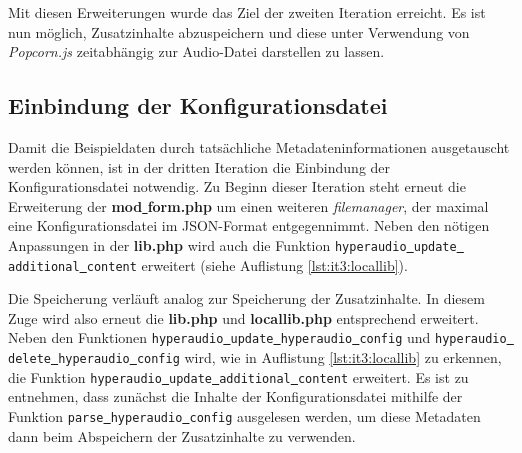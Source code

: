 Mit diesen Erweiterungen wurde das Ziel der zweiten Iteration erreicht. Es ist nun möglich, Zusatzinhalte abzuspeichern und diese unter Verwendung von \textit{Popcorn.js} zeitabhängig zur Audio-Datei darstellen zu lassen.

\subsection{Einbindung der Konfigurationsdatei}
Damit die Beispieldaten durch tatsächliche Metadateninformationen ausgetauscht werden können, ist in der dritten Iteration die Einbindung der Konfigurationsdatei notwendig. Zu Beginn dieser Iteration steht erneut die Erweiterung der \textbf{mod\underline{{ }}form.php} um einen weiteren \textit{filemanager}, der maximal eine Konfigurationsdatei im JSON-Format entgegennimmt. Neben den nötigen Anpassungen in der \textbf{lib.php} wird auch die Funktion \texttt{hyperaudio\underline{{ }}update\underline{{ }}additional\underline{{ }}content} erweitert (siehe Auflistung \ref{lst:it3:locallib}).



Die Speicherung verläuft analog zur Speicherung der Zusatzinhalte. In diesem Zuge wird also erneut die \textbf{lib.php} und \textbf{locallib.php} entsprechend erweitert. Neben den Funktionen \texttt{hyperaudio\underline{{ }}update\underline{{ }}hyperaudio\underline{{ }}config} und \texttt{hyperaudio\underline{{ }}delete\underline{{ }}hyperaudio\underline{{ }}config} wird, wie in Auflistung \ref{lst:it3:locallib} zu erkennen, die Funktion \texttt{hyperaudio\underline{{ }}update\underline{{ }}additional\underline{{ }}content} erweitert. Es ist zu entnehmen, dass zunächst die Inhalte der Konfigurationsdatei mithilfe der Funktion \texttt{parse\underline{{ }}hyperaudio\underline{{ }}config} ausgelesen werden, um diese Metadaten dann beim Abspeichern der Zusatzinhalte zu verwenden.

